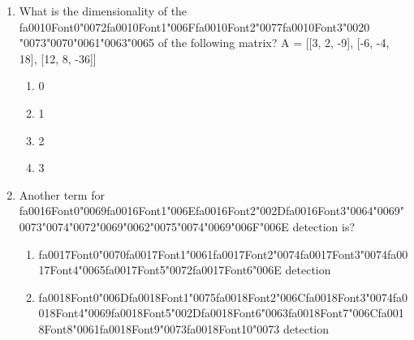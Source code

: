 \documentclass[{\csname fa0013Font0\endcsname\char"0032}{\csname fa0014Font0\endcsname\char"0031}pt]{article}
\begin{document}
\begin{enumerate}[label=\arabic*.]
\begin{enumerate}[label=(\alph*)]
    \item {\csname fa0006Font0\endcsname\char"0046}{\csname fa0006Font1\endcsname\char"0061}{\csname fa0006Font2\endcsname\char"006C}{\csname fa0006Font3\endcsname\char"0073}{\csname fa0006Font4\endcsname\char"0065}, True
    \item {\csname fa0007Font0\endcsname\char"0054}{\csname fa0007Font1\endcsname\char"0072}{\csname fa0007Font2\endcsname\char"0075}{\char"0065}, False
    \item {\csname fa0008Font0\endcsname\char"0046}{\csname fa0008Font1\endcsname\char"0061}{\csname fa0008Font2\endcsname\char"006C}{\csname fa0008Font3\endcsname\char"0073}{\csname fa0008Font4\endcsname\char"0065}, False
    \item {\csname fa0009Font0\endcsname\char"0054}{\csname fa0009Font1\endcsname\char"0072}{\csname fa0009Font2\endcsname\char"0075}{\char"0065}, True
\end{enumerate}
\item What is the dimensionality of the {\csname fa0010Font0\endcsname\char"0072}{\csname fa0010Font1\endcsname\char"006F}{\csname fa0010Font2\endcsname\char"0077}{\csname fa0010Font3\endcsname\char"0020} {\char"0073}{\char"0070}{\char"0061}{\char"0063}{\char"0065} of the following matrix? A = [[3, 2, -9], [-6, -4, 18], [12, 8, -36]]
\begin{enumerate}[label=(\alph*)]
    \item 0
    \item 1
    \item 2
    \item 3
\end{enumerate}
\item Another term for {\csname fa0016Font0\endcsname\char"0069}{\csname fa0016Font1\endcsname\char"006E}{\csname fa0016Font2\endcsname\char"002D}{\csname fa0016Font3\endcsname\char"0064}{\char"0069}{\char"0073}{\char"0074}{\char"0072}{\char"0069}{\char"0062}{\char"0075}{\char"0074}{\char"0069}{\char"006F}{\char"006E} detection is?
\begin{enumerate}[label=(\alph*)]
    \item {\csname fa0017Font0\endcsname\char"0070}{\csname fa0017Font1\endcsname\char"0061}{\csname fa0017Font2\endcsname\char"0074}{\csname fa0017Font3\endcsname\char"0074}{\csname fa0017Font4\endcsname\char"0065}{\csname fa0017Font5\endcsname\char"0072}{\csname fa0017Font6\endcsname\char"006E} detection
    \item {\csname fa0018Font0\endcsname\char"006D}{\csname fa0018Font1\endcsname\char"0075}{\csname fa0018Font2\endcsname\char"006C}{\csname fa0018Font3\endcsname\char"0074}{\csname fa0018Font4\endcsname\char"0069}{\csname fa0018Font5\endcsname\char"002D}{\csname fa0018Font6\endcsname\char"0063}{\csname fa0018Font7\endcsname\char"006C}{\csname fa0018Font8\endcsname\char"0061}{\csname fa0018Font9\endcsname\char"0073}{\csname fa0018Font10\endcsname\char"0073} detection

\end{enumerate}
\end{enumerate}
\end{document}
